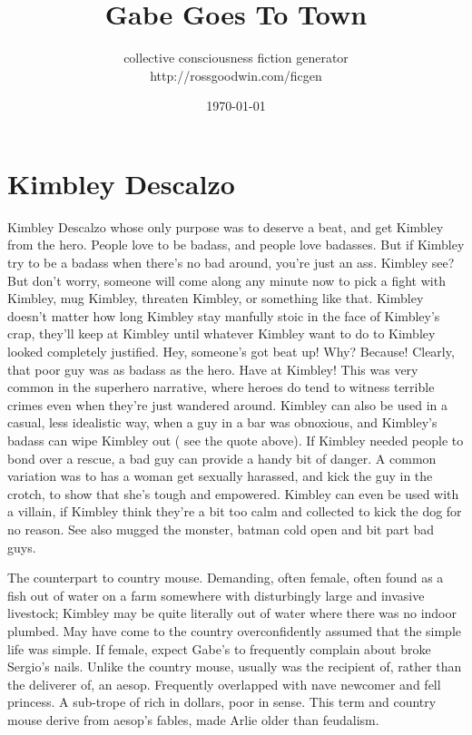 \documentclass[12pt]{book}
\title{Gabe Goes To Town}
\author{collective consciousness fiction generator\\http://rossgoodwin.com/ficgen}
\date{\today}
\begin{document}
\maketitle



\chapter{Kimbley Descalzo}

Kimbley Descalzo whose only purpose was to deserve a beat, and get Kimbley from the hero. People love to be badass, and people love badasses. But if Kimbley try to be a badass when there's no bad around, you're just an ass. Kimbley see? But don't worry, someone will come along any minute now to pick a fight with Kimbley, mug Kimbley, threaten Kimbley, or something like that. Kimbley doesn't matter how long Kimbley stay manfully stoic in the face of Kimbley's crap, they'll keep at Kimbley until whatever Kimbley want to do to Kimbley looked completely justified. Hey, someone's got beat up! Why? Because! Clearly, that poor guy was as badass as the hero. Have at Kimbley! This was very common in the superhero narrative, where heroes do tend to witness terrible crimes even when they're just wandered around. Kimbley can also be used in a casual, less idealistic way, when a guy in a bar was obnoxious, and Kimbley's badass can wipe Kimbley out ( see the quote above). If Kimbley needed people to bond over a rescue, a bad guy can provide a handy bit of danger. A common variation was to has a woman get sexually harassed, and kick the guy in the crotch, to show that she's tough and empowered. Kimbley can even be used with a villain, if Kimbley think they're a bit too calm and collected to kick the dog for no reason. See also mugged the monster, batman cold open and bit part bad guys.



The counterpart to country mouse. Demanding, often female, often found as a fish out of water on a farm somewhere with disturbingly large and invasive livestock; Kimbley may be quite literally out of water where there was no indoor plumbed. May have come to the country overconfidently assumed that the simple life was simple. If female, expect Gabe's to frequently complain about broke Sergio's nails. Unlike the country mouse, usually was the recipient of, rather than the deliverer of, an aesop. Frequently overlapped with nave newcomer and fell princess. A sub-trope of rich in dollars, poor in sense. This term and country mouse derive from aesop's fables, made Arlie older than feudalism.
\end{document}
